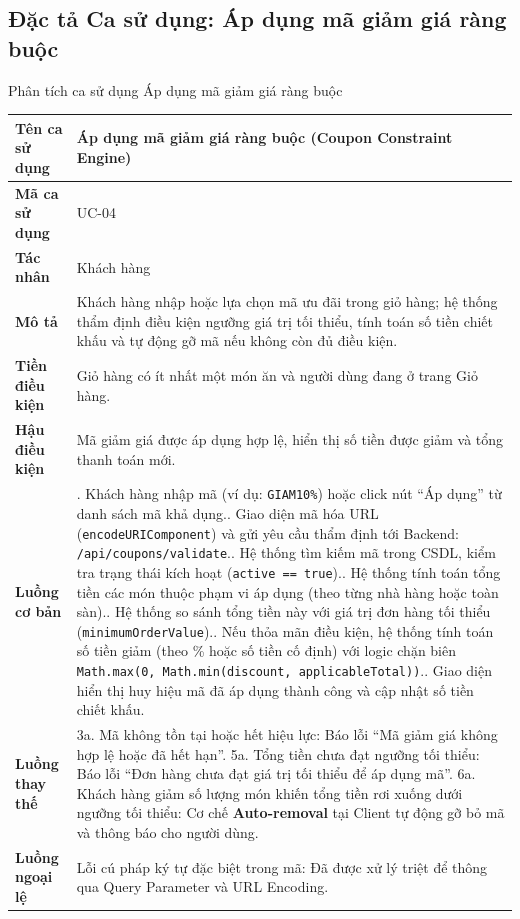 \documentclass{uetgraduation}
\begin{document}
\clearpage
\subsection{Đặc tả Ca sử dụng: Áp dụng mã giảm giá ràng buộc}
\begin{table}[!htbp]{Phân tích ca sử dụng Áp dụng mã giảm giá ràng buộc}
\centering
\small
\begin{tabularx}{\textwidth}{|l|>{\raggedright\arraybackslash}X|}
\hline
\textbf{Tên ca sử dụng} & \textbf{Áp dụng mã giảm giá ràng buộc (Coupon Constraint Engine)} \\ \hline
\textbf{Mã ca sử dụng} & UC-04 \\ \hline
\textbf{Tác nhân} & Khách hàng \\ \hline
\textbf{Mô tả} & Khách hàng nhập hoặc lựa chọn mã ưu đãi trong giỏ hàng; hệ thống thẩm định điều kiện ngưỡng giá trị tối thiểu, tính toán số tiền chiết khấu và tự động gỡ mã nếu không còn đủ điều kiện. \\ \hline
\textbf{Tiền điều kiện} & Giỏ hàng có ít nhất một món ăn và người dùng đang ở trang Giỏ hàng. \\ \hline
\textbf{Hậu điều kiện} & Mã giảm giá được áp dụng hợp lệ, hiển thị số tiền được giảm và tổng thanh toán mới. \\ \hline
\textbf{Luồng cơ bản} & 
1. Khách hàng nhập mã (ví dụ: \texttt{GIAM10\%}) hoặc click nút ``Áp dụng'' từ danh sách mã khả dụng.\newline
2. Giao diện mã hóa URL (\texttt{encodeURIComponent}) và gửi yêu cầu thẩm định tới Backend: \texttt{/api/coupons/validate}.\newline
3. Hệ thống tìm kiếm mã trong CSDL, kiểm tra trạng thái kích hoạt (\texttt{active == true}).\newline
4. Hệ thống tính toán tổng tiền các món thuộc phạm vi áp dụng (theo từng nhà hàng hoặc toàn sàn).\newline
5. Hệ thống so sánh tổng tiền này với giá trị đơn hàng tối thiểu (\texttt{minimumOrderValue}).\newline
6. Nếu thỏa mãn điều kiện, hệ thống tính toán số tiền giảm (theo \% hoặc số tiền cố định) với logic chặn biên \texttt{Math.max(0, Math.min(discount, applicableTotal))}.\newline
7. Giao diện hiển thị huy hiệu mã đã áp dụng thành công và cập nhật số tiền chiết khấu. \\ \hline
\textbf{Luồng thay thế} & 
3a. Mã không tồn tại hoặc hết hiệu lực: Báo lỗi ``Mã giảm giá không hợp lệ hoặc đã hết hạn''.\newline
5a. Tổng tiền chưa đạt ngưỡng tối thiểu: Báo lỗi ``Đơn hàng chưa đạt giá trị tối thiểu để áp dụng mã''.\newline
6a. Khách hàng giảm số lượng món khiến tổng tiền rơi xuống dưới ngưỡng tối thiểu: Cơ chế \textbf{Auto-removal} tại Client tự động gỡ bỏ mã và thông báo cho người dùng. \\ \hline
\textbf{Luồng ngoại lệ} & 
Lỗi cú pháp ký tự đặc biệt trong mã: Đã được xử lý triệt để thông qua Query Parameter và URL Encoding. \\ \hline
\end{tabularx}
\end{table}
\end{document}
